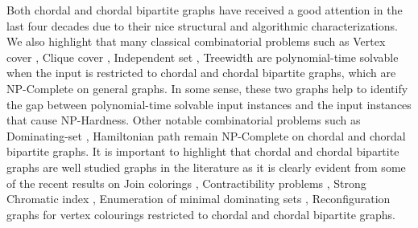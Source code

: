 \documentclass[runningheads]{llncs}
\begin{document}
Both chordal and chordal bipartite graphs have received a good attention in the last four decades due to their nice structural and algorithmic characterizations. We also highlight that many classical combinatorial problems such as Vertex cover \cite{tarjan,gavril}, Clique cover \cite{corneil,Hoang}, Independent set \cite{gavril}, Treewidth \cite{bodlaender,kloks} are polynomial-time solvable when the input is restricted to chordal and chordal bipartite graphs, which are NP-Complete on general graphs. In some sense, these two graphs help to identify the gap between polynomial-time solvable input instances and the input instances that cause NP-Hardness. Other notable combinatorial problems such as Dominating-set \cite{booth,mueller}, Hamiltonian path \cite{colbourn,muellerh} remain NP-Complete on chordal and chordal bipartite graphs. It is important to highlight that chordal and chordal bipartite graphs are well studied graphs in the literature as it is clearly evident from some of the recent results on Join colorings \cite{join}, Contractibility problems \cite{contractibility}, Strong Chromatic index \cite{strong}, Enumeration of minimal dominating sets \cite{enumeration}, Reconfiguration graphs for vertex colourings \cite{reconfiguration} restricted to  chordal and chordal bipartite graphs.
\end{document}
